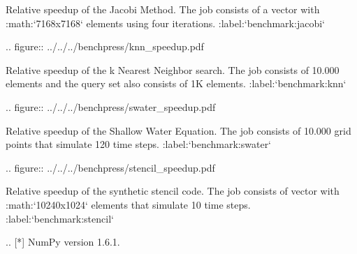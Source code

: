    Relative speedup of the Jacobi Method. The job consists of a vector with :math:`7168x7168` elements using four iterations. :label:`benchmark:jacobi`

.. figure:: ../../../benchpress/knn_speedup.pdf

   Relative speedup of the k Nearest Neighbor search. The job consists of 10.000 elements and the query set also consists of 1K elements. :label:`benchmark:knn`

.. figure:: ../../../benchpress/swater_speedup.pdf

   Relative speedup of the Shallow Water Equation. The job consists of 10.000 grid points that simulate 120 time steps. :label:`benchmark:swater`

.. figure:: ../../../benchpress/stencil_speedup.pdf

   Relative speedup of the synthetic stencil code. The job consists of vector with :math:`10240x1024` elements that simulate 10 time steps. :label:`benchmark:stencil`

.. [*] NumPy version 1.6.1.
